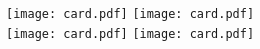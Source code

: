 \documentclass[a4paper]{article}
\def\vhbox#1#2{\fbox{\vbox{\vspace*{#1}}\hbox{\hspace*{#2}}}}
\begin{document}
    \setlength{\fboxrule}{1pt}
    \setlength{\fboxsep}{-1pt}
    \centering
    \vhbox{133.5mm}{89mm}
    \vhbox{133.5mm}{89mm} \\
    \vhbox{133.5mm}{89mm}
    \vhbox{133.5mm}{89mm} \\

    \texttt{[image: card.pdf]}
    \texttt{[image: card.pdf]} \\
    \texttt{[image: card.pdf]}
    \texttt{[image: card.pdf]}
\end{document}

